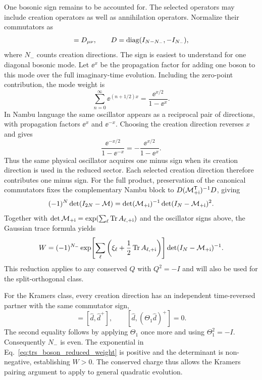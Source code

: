 One bosonic sign remains to be accounted for. The selected operators may include creation operators as well as annihilation operators. Normalize their commutators as
\begin{equation}
    [\hat d_\mu,\hat d_\nu^+]=D_{\mu\nu},\qquad
    D=\diag(I_{N-N_-},-I_{N_-}),
    \label{eq:trs_reduced_commutator}
\end{equation}
where $N_-$ counts creation directions. The sign is easiest to understand for one diagonal bosonic mode. Let $\ee^x$ be the propagation factor for adding one boson to this mode over the full imaginary-time evolution. Including the zero-point contribution, the mode weight is
\begin{equation}
    \sum_{n=0}^{\infty}\ee^{(n+1/2)x}
    =\frac{\ee^{x/2}}{1-\ee^x}.
\end{equation}
In Nambu language the same oscillator appears as a reciprocal pair of directions, with propagation factors $\ee^x$ and $\ee^{-x}$. Choosing the creation direction reverses $x$ and gives
\begin{equation}
    \frac{\ee^{-x/2}}{1-\ee^{-x}}
    =-\frac{\ee^{x/2}}{1-\ee^x}.
    \label{eq:trs_boson_reversed_mode}
\end{equation}
Thus the same physical oscillator acquires one minus sign when its creation direction is used in the reduced sector. Each selected creation direction therefore contributes one minus sign. For the full product, preservation of the canonical commutators fixes the complementary Nambu block to $D(\mathcal{M}_{+\mathrm{i}}^{\mathsf{T}})^{-1}D$, giving
\begin{equation}
    (-1)^N\det(I_{2N}-\mathcal{M})
    =\det(\mathcal{M}_{+\mathrm{i}})^{-1}\det(I_N-\mathcal{M}_{+\mathrm{i}})^2.
    \label{eq:trs_boson_reduced_square}
\end{equation}
Together with $\det\mathcal{M}_{+\mathrm{i}}=\exp(\sum_\ell\operatorname{Tr} A_{\ell,+\mathrm{i}})$ and the oscillator signs above, the Gaussian trace formula yields
\begin{equation}
    W=(-1)^{N_-}
    \exp\!\left[\sum_\ell\left(\xi_\ell+\frac12\operatorname{Tr} A_{\ell,+\mathrm{i}}\right)\right]
    \det(I_N-\mathcal{M}_{+\mathrm{i}})^{-1}.
    \label{eq:trs_boson_reduced_weight}
\end{equation}
This reduction applies to any conserved $Q$ with $Q^2=-I$ and will also be used for the split-orthogonal class.

For the Kramers class, every creation direction has an independent time-reversed partner with the same commutator sign,
\begin{equation}
    [\Theta_1\hat d,(\Theta_1\hat d)^+]=[\hat d,\hat d^+],
    \qquad [\hat d,(\Theta_1\hat d)^+]=0.
    \label{eq:trs_commutator_Kramers_pair}
\end{equation}
The second equality follows by applying $\Theta_1$ once more and using $\Theta_1^2=-I$. Consequently $N_-$ is even. The exponential in Eq.~\eqref{eq:trs_boson_reduced_weight} is positive and the determinant is non-negative, establishing $W>0$. The conserved charge thus allows the Kramers pairing argument to apply to general quadratic evolution.

